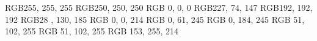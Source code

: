 \newcommand{\en}{\selectlanguage{english}}
\newcommand{\gr}{\selectlanguage{greek}}
        
\definecolor{kWhite}         {RGB}{255, 255, 255}
\definecolor{kSnow}          {RGB}{250, 250, 250}
\definecolor{kBlack}         {RGB}{  0,   0,   0}
\definecolor{kPink}          {RGB}{227,  74, 147}
\definecolor{kGray}          {RGB}{192, 192, 192}
\definecolor{kNavyBlue}      {RGB}{28 , 130, 185}
\definecolor{kDarkBlue}      {RGB}{  0,   0, 214}
\definecolor{kLightBlue}     {RGB}{  0,  61, 245}
\definecolor{kvLightBlue}    {RGB}{  0, 184, 245}
\definecolor{kMyBlue}        {RGB}{ 51, 102, 255}
\definecolor{kBlue}          {RGB}{ 51, 102, 255}
\definecolor{kCyan}          {RGB}{ 153, 255, 214}

